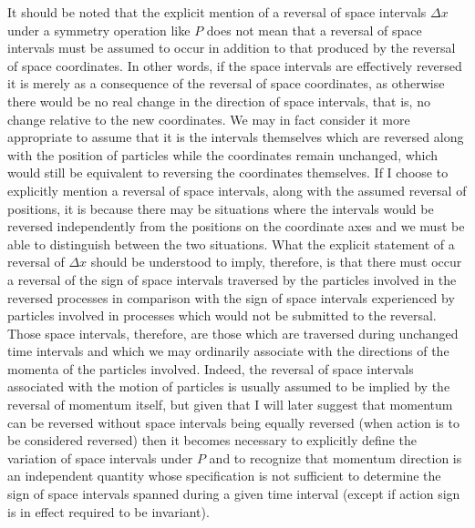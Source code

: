 \documentclass[notitlepage,12pt]{report}
\begin{document}
It should be noted that the explicit mention of a reversal of space intervals $\Delta x$ under a symmetry operation like $P$ does not mean that a reversal of space intervals must be assumed to occur in addition to that produced by the reversal of space coordinates. In other words, if the space intervals are effectively reversed it is merely as a consequence of the reversal of space coordinates, as otherwise there would be no real change in the direction of space intervals, that is, no change relative to the new coordinates. We may in fact consider it more appropriate to assume that it is the intervals themselves which are reversed along with the position of particles while the coordinates remain unchanged, which would still be equivalent to reversing the coordinates themselves. If I choose to explicitly mention a reversal of space intervals, along with the assumed reversal of positions, it is because there may be situations where the intervals would be reversed independently from the positions on the coordinate axes and we must be able to distinguish between the two situations. What the explicit statement of a reversal of $\Delta x$ should be understood to imply, therefore, is that there must occur a reversal of the sign of space intervals traversed by the particles involved in the reversed processes in comparison with the sign of space intervals experienced by particles involved in processes which would not be submitted to the reversal. Those space intervals, therefore, are those which are traversed during unchanged time intervals and which we may ordinarily associate with the directions of the momenta of the particles involved. Indeed, the reversal of space intervals associated with the motion of particles is usually assumed to be implied by the reversal of momentum itself, but given that I will later suggest that momentum can be reversed without space intervals being equally reversed (when action is to be considered reversed) then it becomes necessary to explicitly define the variation of space intervals under $P$ and to recognize that momentum direction is an independent quantity whose specification is not sufficient to determine the sign of space intervals spanned during a given time interval (except if action sign is in effect required to be invariant).
\end{document}
